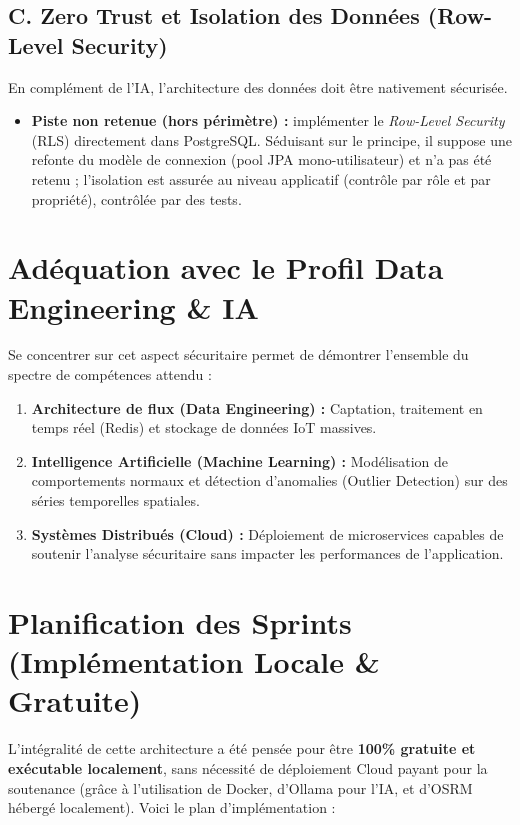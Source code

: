 \documentclass[11pt,a4paper]{article}
\begin{document}
\subsection{C. Zero Trust et Isolation des Données (Row-Level Security)}
En complément de l'IA, l'architecture des données doit être nativement sécurisée.
\begin{itemize}
    \item \textbf{Piste non retenue (hors périmètre) :} implémenter le \textit{Row-Level Security} (RLS) directement dans PostgreSQL. Séduisant sur le principe, il suppose une refonte du modèle de connexion (pool JPA mono-utilisateur) et n'a pas été retenu ; l'isolation est assurée au niveau applicatif (contrôle par rôle et par propriété), contrôlée par des tests.
\end{itemize}

\section{Adéquation avec le Profil Data Engineering \& IA}
Se concentrer sur cet aspect sécuritaire permet de démontrer l'ensemble du spectre de compétences attendu :
\begin{enumerate}
    \item \textbf{Architecture de flux (Data Engineering) :} Captation, traitement en temps réel (Redis) et stockage de données IoT massives.
    \item \textbf{Intelligence Artificielle (Machine Learning) :} Modélisation de comportements normaux et détection d'anomalies (Outlier Detection) sur des séries temporelles spatiales.
    \item \textbf{Systèmes Distribués (Cloud) :} Déploiement de microservices capables de soutenir l'analyse sécuritaire sans impacter les performances de l'application.
\end{enumerate}

\section{Planification des Sprints (Implémentation Locale \& Gratuite)}
L'intégralité de cette architecture a été pensée pour être \textbf{100\% gratuite et exécutable localement}, sans nécessité de déploiement Cloud payant pour la soutenance (grâce à l'utilisation de Docker, d'Ollama pour l'IA, et d'OSRM hébergé localement). Voici le plan d'implémentation :
\end{document}
